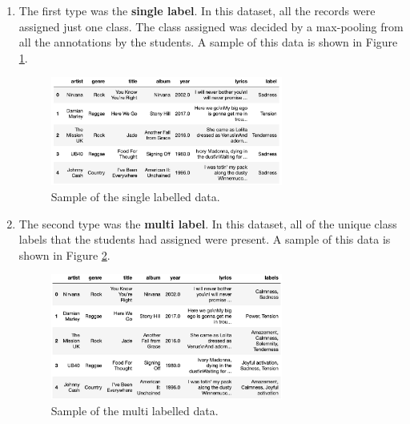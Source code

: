 \documentclass[11pt,a4paper]{article}
\begin{document}
\begin{enumerate}
  \item The first type was the \textbf{single label}. In this dataset, all the records were assigned just one class. The class assigned was decided by a max-pooling from all the annotations by the students. A sample of this data is shown in Figure \ref{single_label}.
  \begin{figure}[!htbp]
  \begin{center}
  \includegraphics[width=3in]{1_single_label.png}
  \caption{Sample of the single labelled data.}
  \label{single_label}
  \end{center}
  \end{figure}

  \item The second type was the \textbf{multi label}. In this dataset, all of the unique class labels that the students had assigned were present. A sample of this data is shown in Figure \ref{multi_label}.
  \begin{figure}[!htbp]
  \begin{center}
  \includegraphics[width=3in]{2_multi_label.png}
  \caption{Sample of the multi labelled data.}
  \label{multi_label}
  \end{center}
  \end{figure}

\end{enumerate}
\end{document}
